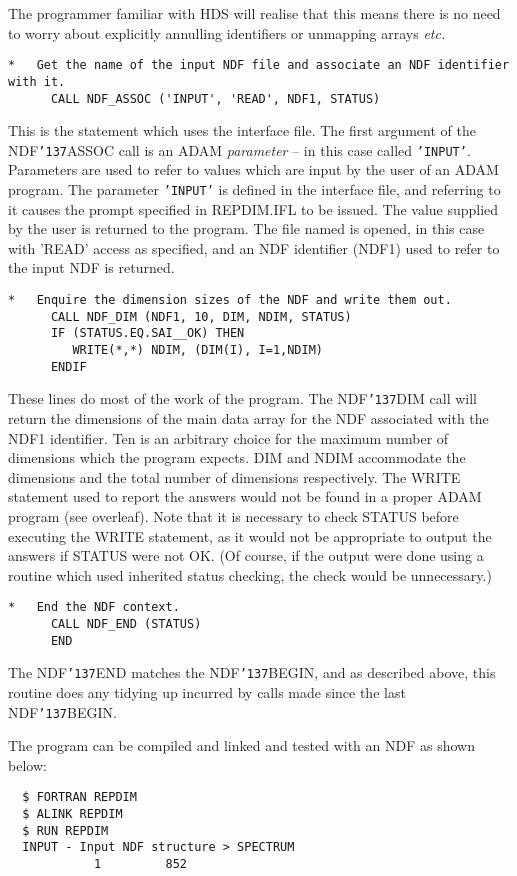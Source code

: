 \documentclass[twoside,11pt]{article}
\renewcommand{\_}{{\tt\char'137}}
\begin{document}
The programmer familiar with HDS will realise that this means 
there is no need to worry about explicitly 
annulling identifiers or unmapping arrays {\it etc.}
\begin{verbatim}
*   Get the name of the input NDF file and associate an NDF identifier with it.
      CALL NDF_ASSOC ('INPUT', 'READ', NDF1, STATUS)
\end{verbatim}
This is the statement which uses the interface file.
The first argument of the NDF\_ASSOC call is an ADAM {\sl parameter} --
in this case called {\tt 'INPUT'}.
Parameters are used to refer to values which are input by the user of an 
ADAM program.
The parameter {\tt'INPUT'} is defined in the interface file, and referring to it
causes the prompt specified in REPDIM.IFL to be issued.
The value
supplied by the user is returned to the program.
The file named is opened, in this case with 'READ' access
as specified, and an NDF identifier (NDF1) used to refer to the input NDF
is returned.
\begin{verbatim}
*   Enquire the dimension sizes of the NDF and write them out.
      CALL NDF_DIM (NDF1, 10, DIM, NDIM, STATUS)
      IF (STATUS.EQ.SAI__OK) THEN
         WRITE(*,*) NDIM, (DIM(I), I=1,NDIM)
      ENDIF
\end{verbatim}
These lines do most of the work of the program.
The NDF\_DIM call will return the dimensions of the main data array
for the NDF associated with the NDF1 identifier.
Ten is an arbitrary choice  for the maximum number of dimensions 
which the program expects.
DIM and NDIM accommodate the dimensions and the total number of dimensions 
respectively.
The WRITE statement used to report the answers would not be found in 
a proper ADAM program (see overleaf).
Note that it is necessary to check STATUS before executing the WRITE 
statement, as it would not be appropriate to output the answers
if STATUS were not OK.
(Of course, if the output were done  using a routine which used
inherited status checking, the check would be unnecessary.)
\begin{verbatim}
*   End the NDF context.                                       
      CALL NDF_END (STATUS)                                  
      END                 
\end{verbatim}
The NDF\_END matches the NDF\_BEGIN,
and as described above, this routine does any tidying up incurred by 
calls made since the last NDF\_BEGIN.

The program can be compiled and linked  and tested with 
an NDF as shown below:
\begin{verbatim}
  $ FORTRAN REPDIM
  $ ALINK REPDIM
  $ RUN REPDIM
  INPUT - Input NDF structure > SPECTRUM
            1         852
\end{verbatim}
\end{document}
